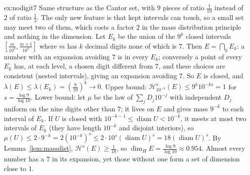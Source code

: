 \begin{solution}{ex:nodigit7}
\idea Same structure as the Cantor set, with $9$ pieces of ratio $\frac1{10}$ instead of $2$ of ratio $\frac13$. The only new feature is that kept intervals can touch, so a small set may meet two of them, which costs a factor $2$ in
the mass distribution principle and nothing in the dimension.
\writeup Let $E_k$ be the union of the $9^k$ closed intervals $[\frac m{10^k},\frac{m+1}{10^k}]$ where $m$ has $k$ decimal digits none of which is $7$. Then $E=\bigcap_kE_k$: a number with an expansion avoiding $7$ is in every $E_k$;
conversely a point of every $E_k$ has, at each level, a chosen digit different from $7$, and these choices are consistent (nested intervals), giving an expansion avoiding $7$. So $E$ is closed, and $\lambda(E)\le\lambda(E_k)=(\frac9{10})^k\to0$.
Upper bound: $\mathcal H^s_{10^{-k}}(E)\le9^k10^{-ks}=1$ for $s=\frac{\log9}{\log10}$. Lower bound: let $\mu$ be the law of $\sum_jD_j10^{-j}$ with independent $D_j$ uniform on the nine digits other than $7$; it lives on $E$ and gives
mass $9^{-k}$ to each interval of $E_k$. If $U$ is closed with $10^{-k-1}\le\operatorname{diam}U<10^{-k}$, it meets at most two intervals of $E_k$ (they have length $10^{-k}$ and disjoint interiors), so
$\mu(U)\le2\cdot9^{-k}=2(10^{-k})^s\le2\cdot10^s(\operatorname{diam}U)^s=18(\operatorname{diam}U)^s$. By Lemma~\ref{lem:massdist}, $\mathcal H^s(E)\ge\frac1{18}$, so $\dim_HE=\frac{\log9}{\log10}\approx0.954$. Almost every number has a $7$ in its
expansion, yet those without one form a set of dimension close to $1$.
\end{solution}

